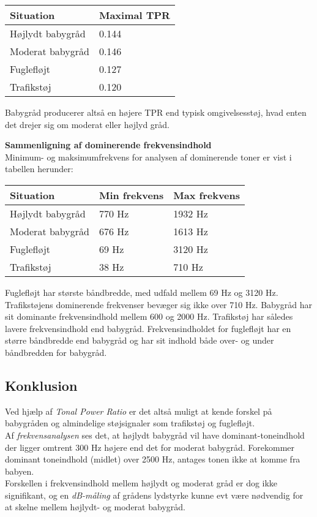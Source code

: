\begin{center}
    \begin{tabular}{ | l | l |}
    \hline
    \textbf{Situation} & \textbf{Maximal TPR}  \\ \hline
    Højlydt babygråd & 0.144   \\ \hline
    Moderat babygråd & 0.146  \\ \hline
    Fuglefløjt & 0.127  \\ \hline
    Trafikstøj & 0.120  \\
    \hline
    \end{tabular}
\end{center}

Babygråd producerer altså en højere TPR end typisk omgivelsesstøj, hvad enten det drejer sig om moderat eller højlyd gråd.

\textbf{Sammenligning af dominerende frekvensindhold}	\\
Minimum- og maksimumfrekvens for analysen af dominerende toner er vist i tabellen herunder:
\begin{center}
    \begin{tabular}{ | l | l | l |}
    \hline
    \textbf{Situation} &	\textbf{Min frekvens}	& 	\textbf{Max frekvens}  \\ \hline
    Højlydt babygråd & 		770 Hz &					1932 Hz\\ \hline
    Moderat babygråd & 		676 Hz &					1613 Hz\\ \hline
    Fuglefløjt & 			69  Hz &					3120 Hz\\ \hline
    Trafikstøj & 			38  Hz &					710 Hz\\
    \hline
    \end{tabular}
\end{center}

Fuglefløjt har største båndbredde, med udfald mellem 69 Hz og 3120 Hz. Trafikstøjens dominerende frekvenser bevæger sig ikke over 710 Hz. Babygråd har sit dominante frekvensindhold mellem 600 og 2000 Hz. Trafikstøj har således lavere frekvensindhold end babygråd. Frekvensindholdet for fuglefløjt har en større båndbredde end babygråd og har sit indhold både over- og under båndbredden for babygråd.

\subsection{Konklusion}
Ved hjælp af \textit{Tonal Power Ratio} er det altså muligt at kende forskel på babygråden og almindelige støjsignaler som trafikstøj og fuglefløjt. \\
Af \textit{frekvensanalysen} ses det, at højlydt babygråd vil have dominant-toneindhold der ligger omtrent 300 Hz højere end det for moderat babygråd. Forekommer dominant toneindhold (midlet) over 2500 Hz, antages tonen ikke at komme fra babyen. \\
Forskellen i frekvensindhold mellem højlydt og moderat gråd er dog ikke signifikant, og en \textit{dB-måling} af grådens lydstyrke kunne evt være nødvendig for at skelne mellem højlydt- og moderat babygråd.